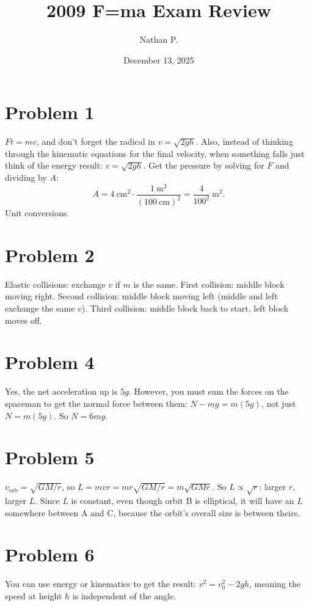\documentclass[11pt]{article}
\title{2009 F=ma Exam Review}
\author{Nathan P.}
\date{December 13, 2025}
\begin{document}
\maketitle

\section*{Problem 1}
$Ft=mv$, and don't forget the radical in $v=\sqrt{2gh}$. Also, instead of thinking through the kinematic equations for the final velocity, when something falls just think of the energy result: $v=\sqrt{2gh}$.
Get the pressure by solving for $F$ and dividing by $A$:
\[
A=4\ \text{cm}^2\cdot\frac{1\ \text{m}^2}{(100\ \text{cm})^2}=\frac{4}{100^2}\ \text{m}^2.
\]
Unit conversions.

\section*{Problem 2}
Elastic collisions: exchange $v$ if $m$ is the same. First collision: middle block moving right. Second collision: middle block moving left (middle and left exchange the same $v$). Third collision: middle block back to start, left block moves off.

\section*{Problem 4}
Yes, the net acceleration up is $5g$. However, you must sum the forces on the spaceman to get the normal force between them: $N-mg=m(5g)$, not just $N=m(5g)$. So $N=6mg$.

\section*{Problem 5}
$v_{\text{orb}}=\sqrt{GM/r}$, so $L=mvr=mr\sqrt{GM/r}=m\sqrt{GMr}$. So $L\propto\sqrt r$: larger $r$, larger $L$.
Since $L$ is constant, even though orbit B is elliptical, it will have an $L$ somewhere between A and C, because the orbit's overall size is between theirs.

\section*{Problem 6}
You can use energy or kinematics to get the result: $v^2=v_0^2-2gh$, meaning the speed at height $h$ is independent of the angle.
\end{document}
